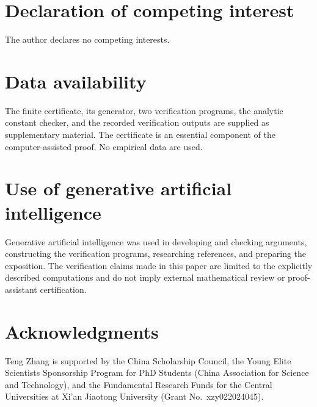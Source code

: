 \documentclass[11pt,letterpaper,reqno]{amsart}
\theoremstyle{definition}
\numberwithin{equation}{section}
\begin{document}
\section*{Declaration of competing interest}
The author declares no competing interests.

\section*{Data availability}
The finite certificate, its generator, two verification programs, the analytic constant checker, and the recorded verification outputs are supplied as supplementary material. The certificate is an essential component of the computer-assisted proof. No empirical data are used.

\section*{Use of generative artificial intelligence}
Generative artificial intelligence was used in developing and checking arguments, constructing the verification programs, researching references, and preparing the exposition. The verification claims made in this paper are limited to the explicitly described computations and do not imply external mathematical review or proof-assistant certification.

\section*{Acknowledgments}
Teng Zhang is supported by the China Scholarship Council, the Young Elite Scientists Sponsorship Program for PhD Students (China Association for Science and Technology), and the Fundamental Research Funds for the Central Universities at Xi'an Jiaotong University (Grant No.~xzy022024045).
\end{document}
